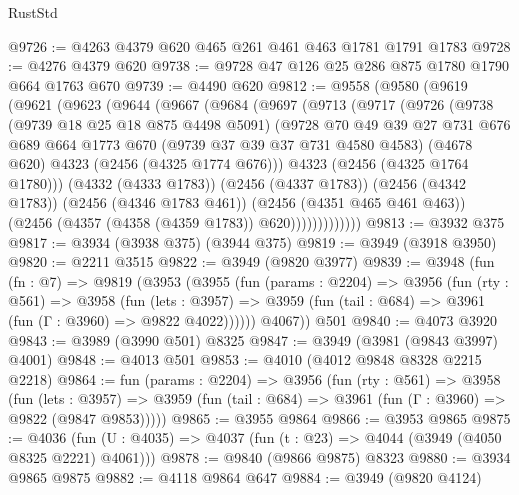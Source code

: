 \begin{lexlean}{RustStd}
\begin{coremodule}
@9726 := @4263 @4379 @620 @465 @261 @461 @463 @1781 @1791 @1783
@9728 := @4276 @4379 @620
@9738 := @9728 @47 @126 @25 @286 @875 @1780 @1790 @664 @1763 @670
@9739 := @4490 @620
@9812 := @9558
    (@9580
      (@9619
        (@9621
          (@9623
            (@9644
              (@9667
                (@9684
                  (@9697
                    (@9713
                      (@9717
                        (@9726
                          (@9738
                            (@9739 @18 @25 @18 @875 @4498 @5091)
                            (@9728
                              @70
                              @49
                              @39
                              @27
                              @731
                              @676
                              @689
                              @664
                              @1773
                              @670
                              (@9739 @37 @39 @37 @731 @4580 @4583)
                              (@4678 @620)
                              @4323
                              (@2456 (@4325 @1774 @676)))
                            @4323
                            (@2456 (@4325 @1764 @1780)))
                          (@4332 (@4333 @1783))
                          (@2456 (@4337 @1783))
                          (@2456 (@4342 @1783))
                          (@2456 (@4346 @1783 @461))
                          (@2456 (@4351 @465 @461 @463))
                          (@2456 (@4357 (@4358 (@4359 @1783)) @620)))))))))))))
@9813 := @3932 @375
@9817 := @3934 (@3938 @375) (@3944 @375)
@9819 := @3949 (@3918 @3950)
@9820 := @2211 @3515
@9822 := @3949 (@9820 @3977)
@9839 := @3948
    (fun (fn : @7) =>
    @9819
      (@3953
        (@3955
          (fun (params : @2204) =>
          @3956
            (fun (rty : @561) =>
            @3958
              (fun (lets : @3957) =>
              @3959 (fun (tail : @684) => @3961 (fun (Γ : @3960) => @9822 @4022))))))
        @4067))
    @501
@9840 := @4073 @3920
@9843 := @3989 (@3990 @501) @8325
@9847 := @3949 (@3981 (@9843 @3997) @4001)
@9848 := @4013 @501
@9853 := @4010 (@4012 @9848 @8328 @2215 @2218)
@9864 := fun (params : @2204) =>
  @3956
    (fun (rty : @561) =>
    @3958
      (fun (lets : @3957) =>
      @3959 (fun (tail : @684) => @3961 (fun (Γ : @3960) => @9822 (@9847 @9853)))))
@9865 := @3955 @9864
@9866 := @3953 @9865
@9875 := @4036 (fun (U : @4035) => @4037 (fun (t : @23) => @4044 (@3949 (@4050 @8325 @2221) @4061)))
@9878 := @9840 (@9866 @9875) @8323
@9880 := @3934 @9865 @9875
@9882 := @4118 @9864 @647
@9884 := @3949 (@9820 @4124)

\end{coremodule}
\end{lexlean}
